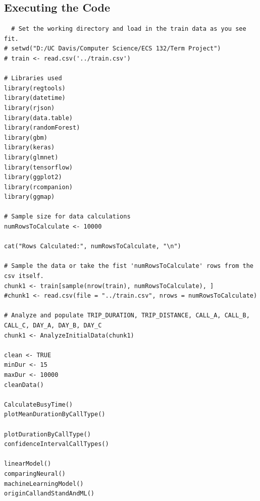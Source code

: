 \documentclass{article}
\numberwithin{equation}{section}
\begin{document}
\subsection{Executing the Code}
\begin{lstlisting}
  # Set the working directory and load in the train data as you see fit.
# setwd("D:/UC Davis/Computer Science/ECS 132/Term Project")
# train <- read.csv('../train.csv')

# Libraries used
library(regtools)
library(datetime)
library(rjson)
library(data.table)
library(randomForest)
library(gbm)
library(keras)
library(glmnet)
library(tensorflow)
library(ggplot2)
library(rcompanion)
library(ggmap)

# Sample size for data calculations
numRowsToCalculate <- 10000

cat("Rows Calculated:", numRowsToCalculate, "\n")

# Sample the data or take the fist 'numRowsToCalculate' rows from the csv itself.
chunk1 <- train[sample(nrow(train), numRowsToCalculate), ]
#chunk1 <- read.csv(file = "../train.csv", nrows = numRowsToCalculate)

# Analyze and populate TRIP_DURATION, TRIP_DISTANCE, CALL_A, CALL_B, CALL_C, DAY_A, DAY_B, DAY_C
chunk1 <- AnalyzeInitialData(chunk1)

clean <- TRUE
minDur <- 15
maxDur <- 10000
cleanData()

CalculateBusyTime()
plotMeanDurationByCallType()

plotDurationByCallType()
confidenceIntervalCallTypes()

linearModel()
comparingNeural()
machineLearningModel()
originCallandStandAndML()
\end{lstlisting}
\end{document}
